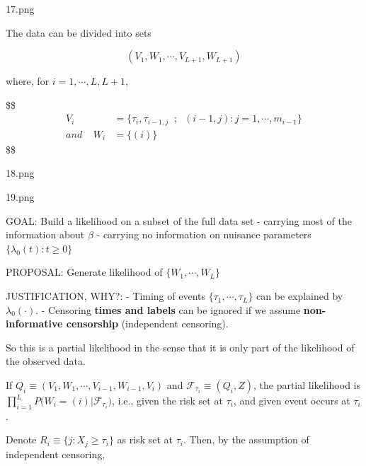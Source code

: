 \documentclass[
]{book}
\theoremstyle{definition}
\theoremstyle{definition}
\theoremstyle{definition}
\theoremstyle{definition}
\theoremstyle{remark}
\begin{document}
17.png

The data can be divided into sets

\[
(V_1 , W_1, \cdots, V_{L+1} ,  W_{L+1})
\]

where, for \(i = 1, \cdots, L, L+1\),

\$\$
\begin{align}
V_i &= \Big \{ \tau_i , \tau_{i-1, j}  \; \; ; \; \; (i-1, j):j = 1, \cdots, m_{i-1} \Big \}

\\

and \; \; \; \;W_i &= \Big \{ (i) \Big \}


\end{align}
\$\$

18.png

19.png

GOAL: Build a likelihood on a subset of the full data set
- carrying most of the information about \(\beta\)
- carrying no information on nuisance parameters \(\Big \{ \lambda_0 (t) : t \ge 0 \Big \}\)

PROPOSAL: Generate likelihood of \(\Big \{ W_1, \cdots, W_L \Big \}\)

JUSTIFICATION, WHY?:
- Timing of events \(\Big \{ \tau_1 , \cdots, \tau_L \Big \}\) can be explained by \(\lambda_0(\cdot)\).
- Censoring \textbf{times and labels} can be ignored if we assume \textbf{non-informative censorship} (independent censoring).

So this is a partial likelihood in the sense that it is only part of the likelihood of the observed data.

If \(Q_i \equiv (V_1, W_1 , \cdots, V_{i-1}, W_{i-1}, V_i)\) and \(\mathcal F_{\tau_i} \equiv (Q_i, Z)\), the partial likelihood is \(\prod_{i=1}^L P \Big ( W_i = (i) \Big | \mathcal F_{\tau_i} \Big)\), i.e., given the risk set at \(\tau_i\), and given event occurs at \(\tau_i\).

Denote \(R_i \equiv \Big \{ j : X_j \ge \tau_i \Big \}\) as risk set at \(\tau_i\). Then, by the assumption of independent censoring,
\end{document}
